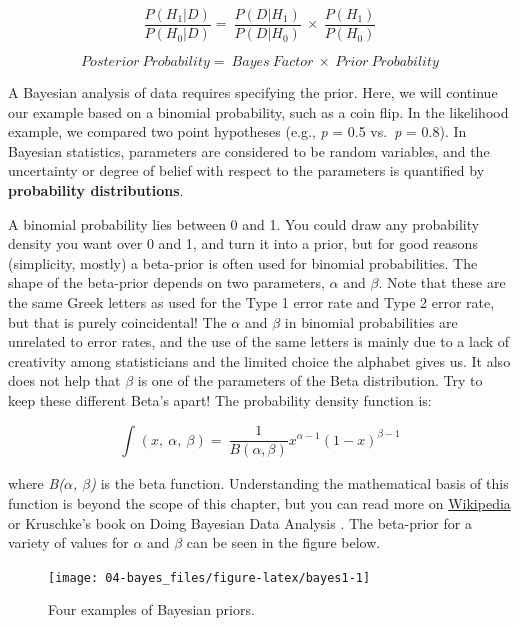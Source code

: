 \documentclass[
  oneside]{krantz}
\begin{document}
\[
\frac{P(H_1|D)}{P(H_0|D)} = \ \frac{P(D|H_1)}{P(D|H_0)}\  \times \ \frac{P(H_1)}{P(H_0)}
\]

\[
Posterior\ Probability = \ Bayes\ Factor\  \times \ Prior\ Probability
\]

A Bayesian analysis of data requires specifying the prior. Here, we will continue our example based on a binomial probability, such as a coin flip. In the likelihood example, we compared two point hypotheses (e.g., \emph{p} = 0.5 vs.~\emph{p} = 0.8). In Bayesian statistics, parameters are considered to be random variables, and the uncertainty or degree of belief with respect to the parameters is quantified by \textbf{probability distributions}.

A binomial probability lies between 0 and 1. You could draw any probability density you want over 0 and 1, and turn it into a prior, but for good reasons (simplicity, mostly) a beta-prior is often used for binomial probabilities. The shape of the beta-prior depends on two parameters, \(\alpha\) and \(\beta\). Note that these are the same Greek letters as used for the Type 1 error rate and Type 2 error rate, but that is purely coincidental! The \(\alpha\) and \(\beta\) in binomial probabilities are unrelated to error rates, and the use of the same letters is mainly due to a lack of creativity among statisticians and the limited choice the alphabet gives us. It also does not help that \(\beta\) is one of the parameters of the Beta distribution. Try to keep these different Beta's apart! The probability density function is:

\[
\int_{}^{}{\left( x,\ \alpha,\ \beta \right) = \ \frac{1}{B(\alpha,\beta)}}x^{\alpha - 1}{(1 - x)}^{\beta - 1}
\]

where \emph{B(\(\alpha\), \(\beta\))} is the beta function. Understanding the mathematical basis of this function is beyond the scope of this chapter, but you can read more on \href{https://en.wikipedia.org/wiki/Beta_distribution}{Wikipedia} or Kruschke's book on Doing Bayesian Data Analysis \citep{kruschke_doing_2014}. The beta-prior for a variety of values for \(\alpha\) and \(\beta\) can be seen in the figure below.



\begin{figure}

{\centering \texttt{[image: 04-bayes\_files/figure-latex/bayes1-1]} 

}

\caption{Four examples of Bayesian priors.}\label{fig:bayes1}
\end{figure}
\end{document}
